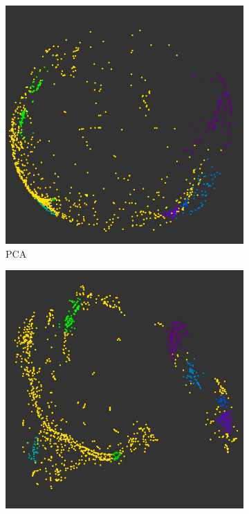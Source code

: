 \begin{figure}[H]
     \centering
     \begin{subfigure}[b]{0.495\textwidth}
         \centering
         \includegraphics[width=\textwidth]{4fig/ppca.png}
         \caption{PCA}
         \label{fig:pcac}
     \end{subfigure}
     \hfill
     \begin{subfigure}[b]{0.495\textwidth}
         \centering
         \includegraphics[width=\textwidth]{4fig/ptsne.png}

\end{subfigure}
\end{figure}

